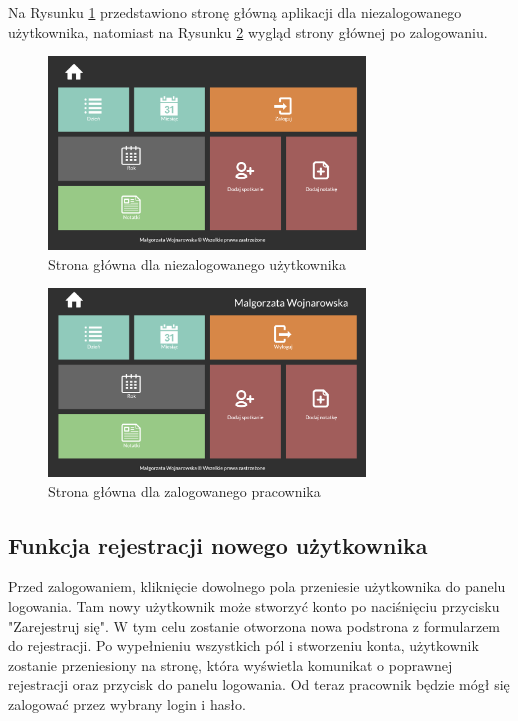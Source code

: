 \documentclass[eng,printmode,openany,oneside]{mgr}
\begin{document}
Na Rysunku \ref{fig:3} przedstawiono stronę główną aplikacji dla niezalogowanego użytkownika, natomiast na Rysunku \ref{fig:4} wygląd strony głównej po zalogowaniu. \\


\begin{figure}[H]
	\centering
	\includegraphics[width=0.75\textwidth]{niezalogowany}
	\caption{Strona główna dla niezalogowanego użytkownika}
	\label{fig:3}
\end{figure}




\begin{figure}[H]
	\centering
	\includegraphics[width=0.75\textwidth]{strona_zalogowany}
	\caption{Strona główna dla zalogowanego pracownika}
	\label{fig:4}
\end{figure}



	\subsection*{Funkcja rejestracji nowego użytkownika}
	Przed zalogowaniem, kliknięcie dowolnego pola przeniesie użytkownika do panelu logowania. Tam nowy użytkownik może stworzyć konto po naciśnięciu przycisku "Zarejestruj się". W tym celu zostanie otworzona nowa podstrona z formularzem do rejestracji. Po wypełnieniu wszystkich pól i stworzeniu konta, użytkownik zostanie przeniesiony na stronę, która wyświetla komunikat o poprawnej rejestracji oraz przycisk do panelu logowania. Od teraz pracownik będzie mógł się zalogować przez wybrany login i hasło.
\end{document}
